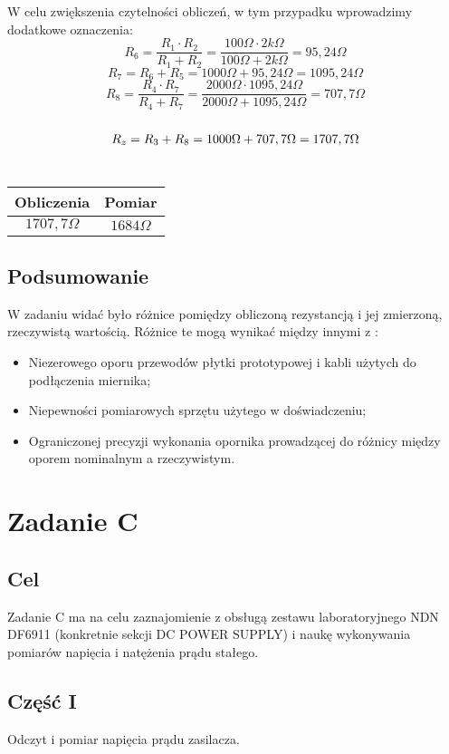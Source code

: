 \documentclass[polish,a4paper]{article}
\begin{document}
W celu zwiększenia czytelności obliczeń, w tym przypadku wprowadzimy dodatkowe oznaczenia:
$$
R_{6} = \frac{R_{1}\cdot R_{2}}{R_{1}+R_{2}} = \frac{100\Omega\cdot 2k\Omega}{100\Omega+2k\Omega} = 95,24\Omega
$$
$$
R_{7} = R_{6} + R_{5} = 1000\Omega + 95,24\Omega = 1095,24\Omega
$$
$$
R_{8} = \frac{R_{4}\cdot R_{7}}{R_{4}+R_{7}} = \frac{2000\Omega\cdot 1095,24\Omega}{2000\Omega + 1095,24\Omega} = 707,7\Omega
$$
\\
$$
R_{z} = R_{3} + R_{8} = 1000\Omega + 707,7\Omega = 1707,7\Omega\\
$$
\\
\begin{tabular}{|c|c|}
\hline
\textbf{Obliczenia} & \textbf{Pomiar}\\
\hline
$1707,7\Omega$ & $1684\Omega$\\
\hline
\end{tabular}

\subsection{Podsumowanie}
W zadaniu widać było różnice pomiędzy obliczoną rezystancją i jej zmierzoną, rzeczywistą wartością. Różnice te mogą wynikać między innymi z 
:
\begin{itemize}
\item Niezerowego oporu przewodów płytki prototypowej i kabli użytych do podłączenia miernika;
\item Niepewności pomiarowych sprzętu użytego w doświadczeniu;
\item Ograniczonej precyzji wykonania opornika prowadzącej do różnicy między oporem nominalnym a rzeczywistym.
\end{itemize}

\section{Zadanie C}
\subsection*{Cel}
Zadanie C ma na celu zaznajomienie z obsługą zestawu laboratoryjnego NDN DF6911 (konkretnie sekcji DC POWER SUPPLY) i naukę wykonywania pomiarów napięcia i natężenia prądu stałego.


\subsection{Część I}
Odczyt i pomiar napięcia prądu zasilacza.
\end{document}
